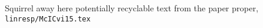 

Squirrel away here potentially recyclable text from the
paper proper, \texttt{linresp/McICvi15.tex}
